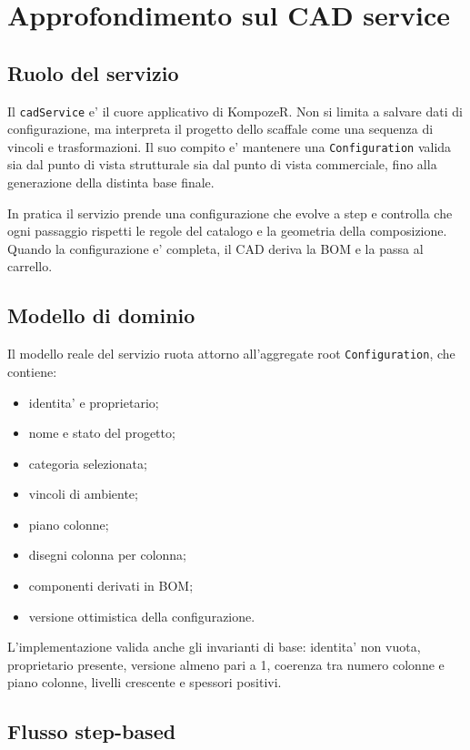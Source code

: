 \chapter{Approfondimento sul CAD service}

\section{Ruolo del servizio}

Il \texttt{cadService} e' il cuore applicativo di KompozeR. Non si limita a salvare dati di configurazione, ma interpreta il progetto dello scaffale come una sequenza di vincoli e trasformazioni. Il suo compito e' mantenere una \texttt{Configuration} valida sia dal punto di vista strutturale sia dal punto di vista commerciale, fino alla generazione della distinta base finale.

In pratica il servizio prende una configurazione che evolve a step e controlla che ogni passaggio rispetti le regole del catalogo e la geometria della composizione. Quando la configurazione e' completa, il CAD deriva la BOM e la passa al carrello.

\section{Modello di dominio}

Il modello reale del servizio ruota attorno all'aggregate root \texttt{Configuration}, che contiene:

\begin{itemize}
\item identita' e proprietario;
\item nome e stato del progetto;
\item categoria selezionata;
\item vincoli di ambiente;
\item piano colonne;
\item disegni colonna per colonna;
\item componenti derivati in BOM;
\item versione ottimistica della configurazione.
\end{itemize}

L'implementazione valida anche gli invarianti di base: identita' non vuota, proprietario presente, versione almeno pari a 1, coerenza tra numero colonne e piano colonne, livelli crescente e spessori positivi.

\section{Flusso step-based}

